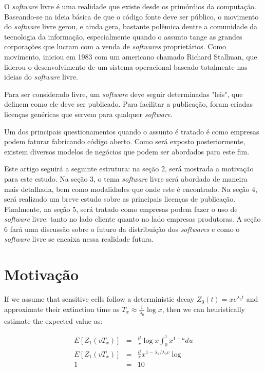 \documentclass{classe_cn}                 %
\begin{document}
O \textit{software} livre é uma realidade que existe desde os primórdios da computação. Baseando-se na ideia básica de que o código fonte deve ser público, o movimento do \textit{software} livre gerou, e ainda gera, bastante polêmica dentre a comunidade da tecnologia da informação, especialmente quando o assunto tange as grandes corporações que lucram com a venda de \textit{softwares} proprietários. Como movimento, iniciou em 1983 \cite{Campos:2016} com um americano chamado Richard Stallman, que liderou o desenvolvimento de um sistema operacional baseado totalmente nas ideias do \textit{software} livre.

Para ser considerado livre, um \textit{software} deve seguir determinadas "leis", que definem como ele deve ser publicado. Para facilitar a publicação, foram criadas licenças genéricas que servem para qualquer \textit{software}.

Um dos principais questionamentos quando o assunto é tratado é como empresas podem faturar fabricando código aberto. Como será exposto posteriormente, existem diversos modelos de negócios que podem ser abordados para este fim.

Este artigo seguirá a seguinte estrutura: na seção 2, será mostrada a motivação para este estudo. Na seção 3, o tema \textit{software} livre será abordado de maneira mais detalhada, bem como modalidades que onde este é encontrado. Na seção 4, será realizado um breve estudo sobre as principais licenças de publicação. Finalmente, na seção 5, será tratado como empresas podem fazer o uso de \textit{software} livre: tanto no lado cliente quanto no lado empresas produtoras. A seção 6 fará uma discussão sobre o futuro da distribuição dos \textit{softwares} e como o \textit{software} livre se encaixa nessa realidade futura.


\section{Motivação}

If we assume that sensitive cells follow a deterministic decay $Z_0(t) = xe^{\lambda_0 t}$ and approximate their extinction time as $T_x \approx \frac{1}{\lambda_0} \log x$, then we can heuristically estimate the expected value as:

\begin{eqnarray}
\label{eqexpmuts}
  E [Z_1(vT_x)] &=& \frac{\mu}{r}\log x \int_0^{1} x^{1-u} du \\
  E [Z_1(vT_x)] &=& \frac{\mu}{r}x^{1-{\lambda_1}/{\lambda_0}v}\log  \\
  1 &=& 10
\end{eqnarray}
\end{document}

